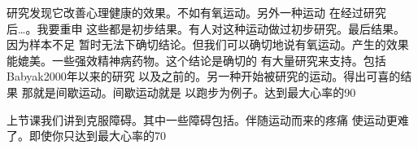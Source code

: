 研究发现它改善心理健康的效果。不如有氧运动。另外一种运动 在经过研究后…。我要重申 这些都是初步结果。有人对这种运动做过初步研究。最后结果。因为样本不足 暂时无法下确切结论。但我们可以确切地说有氧运动。产生的效果能媲美。一些强效精神病药物。这个结论是确切的 有大量研究来支持。包括Babyak2000年以来的研究 以及之前的。另一种开始被研究的运动。得出可喜的结果 那就是间歇运动。间歇运动就是 以跑步为例子。达到最大心率的90%

上节课我们讲到克服障碍。其中一些障碍包括。伴随运动而来的疼痛 使运动更难了。即使你只达到最大心率的70%

